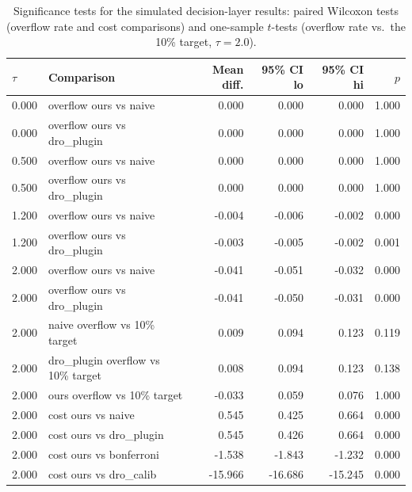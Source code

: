 \begin{table}[htbp]
\centering
\caption{Significance tests for the simulated decision-layer results: paired Wilcoxon tests (overflow rate and cost comparisons) and one-sample $t$-tests (overflow rate vs.\ the 10\% target, $\tau=2.0$).}
\label{tab:decision-stats}
\begin{tabular}{llrrrr}
\toprule
$\tau$ & Comparison & Mean diff. & 95\% CI lo & 95\% CI hi & $p$ \\
\midrule
0.000 & overflow ours vs naive & 0.000 & 0.000 & 0.000 & 1.000 \\
0.000 & overflow ours vs dro\_plugin & 0.000 & 0.000 & 0.000 & 1.000 \\
0.500 & overflow ours vs naive & 0.000 & 0.000 & 0.000 & 1.000 \\
0.500 & overflow ours vs dro\_plugin & 0.000 & 0.000 & 0.000 & 1.000 \\
1.200 & overflow ours vs naive & -0.004 & -0.006 & -0.002 & 0.000 \\
1.200 & overflow ours vs dro\_plugin & -0.003 & -0.005 & -0.002 & 0.001 \\
2.000 & overflow ours vs naive & -0.041 & -0.051 & -0.032 & 0.000 \\
2.000 & overflow ours vs dro\_plugin & -0.041 & -0.050 & -0.031 & 0.000 \\
2.000 & naive overflow vs 10\% target & 0.009 & 0.094 & 0.123 & 0.119 \\
2.000 & dro\_plugin overflow vs 10\% target & 0.008 & 0.094 & 0.123 & 0.138 \\
2.000 & ours overflow vs 10\% target & -0.033 & 0.059 & 0.076 & 1.000 \\
2.000 & cost ours vs naive & 0.545 & 0.425 & 0.664 & 0.000 \\
2.000 & cost ours vs dro\_plugin & 0.545 & 0.426 & 0.664 & 0.000 \\
2.000 & cost ours vs bonferroni & -1.538 & -1.843 & -1.232 & 0.000 \\
2.000 & cost ours vs dro\_calib & -15.966 & -16.686 & -15.245 & 0.000 \\
\bottomrule
\end{tabular}
\end{table}
